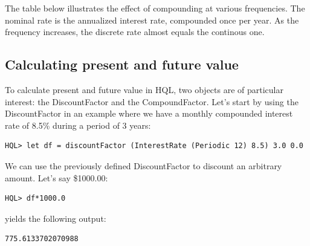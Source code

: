 \documentclass[11pt,a4paper]{article}
\numberwithin{equation}{section}
\newcommand{\comm}[2]{{\sf \(\spadesuit\){\bf #1: }{\rm \sf #2}\(\spadesuit\)}}
\newcommand{\mcomm}[2]{\marginpar{\scriptsize \comm{#1}{#2}}}
\newcommand{\ab}[1]{\mcomm{AB}{#1}}
\begin{document}

The table below illustrates the effect of compounding at various frequencies. The nominal rate
is the annualized interest rate, compounded once per year. As the frequency increases, the discrete
rate almost equals the continous one.


\subsection{Calculating present and future value}


To calculate present and future value in HQL, two objects are of particular interest:
the DiscountFactor and the CompoundFactor. Let's start by using the DiscountFactor in an example
where we have a monthly compounded interest rate of 8.5\% during a period of 3 years:
\FrameSep
\begin{lstlisting}
HQL> let df = discountFactor (InterestRate (Periodic 12) 8.5) 3.0 0.0
\end{lstlisting}
We can use the previously defined DiscountFactor to discount an arbitrary amount. Let's say
\$1000.00:
\FrameSep
\begin{lstlisting}
HQL> df*1000.0
\end{lstlisting}
yields the following output:
\FrameSep
\begin{lstlisting}[style=Output]
775.6133702070988
\end{lstlisting}
\end{document}

